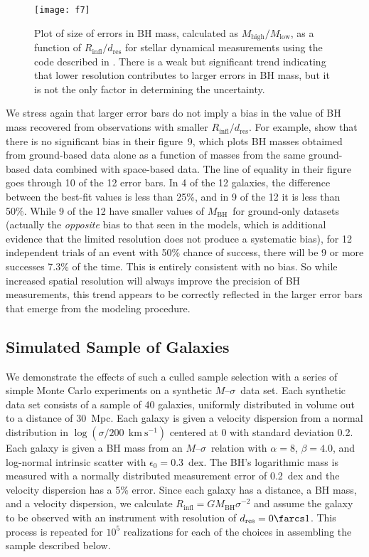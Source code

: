 \documentclass[twosided,letterpaper,numberedappendix]{emulateapj}
\newcommand{\kms}      {\ensuremath{~\mathrm{km~s^{-1}}}}
\newcommand{\msigma}   {\ensuremath{M}{--}\ensuremath{\sigma}}
\newcommand{\mbh}      {\ensuremath{M_{\mathrm{BH}}}}
\newcommand{\rinfres} {\ensuremath{R_{\mathrm{infl}} / d_{\mathrm{res}}}}
\begin{document}
\begin{figure}
\hspace{-0.75cm}\texttt{[image: f7]}
\caption{Plot of size of errors in BH mass, calculated as
$M_\mathrm{high}/M_\mathrm{low}$, as a function of $\rinfres$ for
stellar dynamical measurements using the code described in
.  There is a weak but significant trend
indicating that lower resolution contributes to larger errors in BH
mass, but it is not the only factor in determining the uncertainty.}
\label{f:errrinfl}
\end{figure}


We stress again that larger error bars do not imply a bias in the
value of BH mass recovered from observations with smaller $\rinfres$.
For example, \citet{2003ApJ...583...92G} show that there is no
significant bias in their figure~9, which plots BH masses obtaimed
from ground-based data alone as a function of masses from the same
ground-based data combined with space-based data.  The line of
equality in their figure goes through 10 of the 12 error bars.  In 4
of the 12 galaxies, the difference between the best-fit values is less
than 25\%, and in 9 of the 12 it is less than 50\%.  While 9 of the 12
have smaller values of \mbh\ for ground-only datasets (actually the
\emph{opposite} bias to that seen in the \citet{magorrianetal98}
models, which is additional evidence that the limited resolution does
not produce a systematic bias), for 12 independent trials of an event
with 50\% chance of success, there will be 9 or more successes 7.3\%
of the time.  This is entirely consistent with no bias.  So while
increased spatial resolution will always improve the precision of BH
measurements, this trend appears to be correctly reflected in the larger error bars that emerge from the modeling procedure.


\subsection{Simulated Sample of Galaxies}
\label{mcsample}

We demonstrate the effects of such a culled sample selection with a
series of simple Monte Carlo experiments on a synthetic \msigma\ data
set.  Each synthetic data set consists of a sample of 40 galaxies,
uniformly distributed in volume out to a distance of 30~Mpc.  Each
galaxy is given a velocity dispersion from a normal distribution in
$\log{(\sigma/200~\kms)}$ centered at 0 with standard deviation 0.2.
Each galaxy is given a BH mass from an \msigma\ relation with $\alpha
= 8$, $\beta = 4.0$, and log-normal intrinsic scatter with $\epsilon_0
= 0.3$~dex.  The BH's logarithmic mass is measured with a normally
distributed measurement error of 0.2~dex and the velocity dispersion
has a 5\% error.  Since each galaxy has a distance, a BH mass, and a
velocity dispersion, we calculate $R_{\mathrm{infl}} = G \mbh
\sigma^{-2}$ and assume the galaxy to be observed with an instrument
with resolution of $d_{\mathrm{res}} = 0\farcs1$.  This process is
repeated for $10^5$ realizations for each of the choices in assembling
the sample described below.
\end{document}
